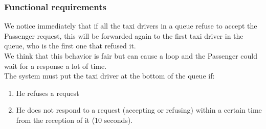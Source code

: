 \subsubsection{Functional requirements}
We notice immediately that if all the taxi drivers in a queue refuse to accept the Passenger request, this will be forwarded again to the first taxi driver in the queue, who is the first one that refused it.
\\ We think that this behavior is fair but can cause a loop and the Passenger could wait for a response a lot of time.\\

The system must put the taxi driver at the bottom of the queue if:
\begin{enumerate}
	\item He refuses a request
	\item He does not respond to a request (accepting or refusing) within a certain time from the reception of it (10 seconds).
\end{enumerate}
